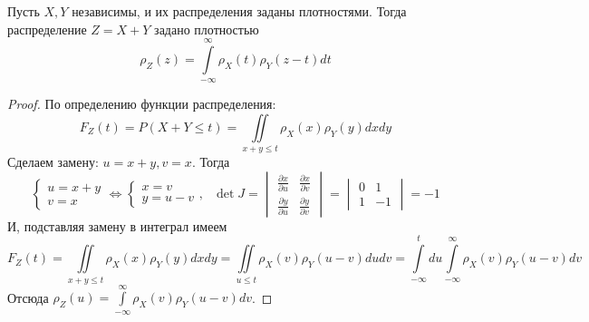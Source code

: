 \begin{corollary}
    Пусть $X, Y$ независимы, и их распределения заданы плотностями. Тогда распределение
    $Z = X + Y$ задано плотностью
    \[
        \rho_Z(z) = \int\limits_{-\infty}^{\infty} \rho_X(t)\rho_Y(z - t) dt
    \]
\end{corollary}
\begin{proof}
    По определению функции распределения:
    \[
        F_Z(t) = P(X + Y \leq t) = \iint\limits_{x + y \leq t} \rho_X(x)\rho_Y(y) dxdy
    \]
    Сделаем замену: $u = x + y, v = x$. Тогда
    \[
        \begin{cases}
            u = x + y\\
            v = x
        \end{cases}
        \iff
        \begin{cases}
            x = v\\
            y = u - v
        \end{cases},
        ~~~
        \det J =
        \begin{vmatrix}
            \frac{\partial x}{\partial u} & \frac{\partial x}{\partial v}\\
            \frac{\partial y}{\partial u} & \frac{\partial y}{\partial v}
        \end{vmatrix}
        =
        \begin{vmatrix}
            0 & 1\\
            1 & -1
        \end{vmatrix}
        = -1
    \]
    И, подставляя замену в интеграл имеем
    \[
        F_Z(t) = \iint\limits_{x + y \leq t} \rho_X(x)\rho_Y(y) dxdy
        = \iint\limits_{u \leq t} \rho_X(v)\rho_Y(u - v) dudv
        = \int\limits_{-\infty}^{t} du \int\limits_{-\infty}^{\infty} \rho_X(v)\rho_Y(u - v) dv
    \]
    Отсюда $\rho_Z(u) = \int\limits_{-\infty}^{\infty} \rho_X(v)\rho_Y(u - v) dv$.
\end{proof}

